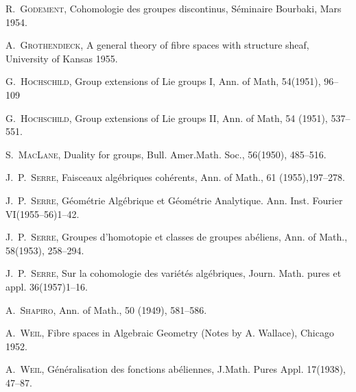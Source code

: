 \begin{list}{}
\item[{[10]}] R.\ \textsc{Godement}, Cohomologie des groupes discontinus,
Séminaire Bourbaki, Mars 1954.

\item[{[11]}] A.\ \textsc{Grothendieck}, A general theory of fibre spaces
with structure sheaf, University of Kansas 1955.

\item[{[12]}] G.\ \textsc{Hochschild}, Group extensions of Lie groups I,
Ann. of Math, 54(1951), 96--109

\item[{[13]}] G.\ \textsc{Hochschild}, Group extensions of Lie groups II,
Ann. of Math, 54 (1951), 537--551.

\item[{[14]}] S.\ \textsc{MacLane}, Duality for groups,
Bull. Amer.Math. Soc., 56(1950), 485--516.

\item[{[15]}] J.\ P.\ \textsc{Serre}, Faisceaux algébriques cohérents,
Ann. of Math., 61 (1955),197--278.

\item[{[16]}] J.\ P.\ \textsc{Serre}, Géométrie Algébrique et Géométrie
Analytique. Ann. Inst. Fourier VI(1955--56)1--42.

\item[{[17]}] J.\ P.\ \textsc{Serre}, Groupes d'homotopie et classes de groupes
abéliens, Ann. of Math., 58(1953), 258--294.

\item[{[18]}] J.\ P.\ \textsc{Serre}, Sur la cohomologie des variétés
algébriques, Journ. Math. pures et appl. 36(1957)\mbox{1--16}.

\item[{[19]}] A.\ \textsc{Shapiro}, Ann. of Math., 50 (1949), 581--586.

\item[{[20]}] A.\ \textsc{Weil}, Fibre spaces in Algebraic Geometry
(Notes by A. Wallace), Chicago 1952.

\item[{[21]}] A.\ \textsc{Weil}, Généralisation des fonctions abéliennes,
J.Math. Pures Appl. 17(1938), 47--87.
\end{list}
\normalsize

